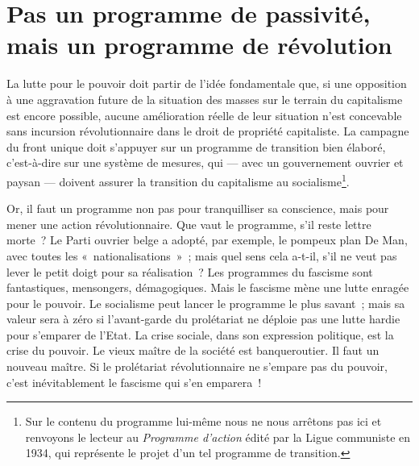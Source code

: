 \documentclass[french,twoside]{book} %
\begin{document}
\section[{Pas un programme de passivité, mais un programme de révolution}]{Pas un programme de passivité, mais un programme de révolution}
\noindent La lutte pour le pouvoir doit partir de l’idée fondamentale que, si une opposition à une aggravation future de la situation des masses sur le terrain du capitalisme est encore possible, aucune amélioration réelle de leur situation n’est concevable sans incursion révolutionnaire dans le droit de propriété capitaliste. La campagne du front unique doit s’appuyer sur un programme de transition bien élaboré, c’est-à-dire sur une système de mesures, qui — avec un gouvernement ouvrier et paysan — doivent assurer la transition du capitalisme au socialisme\footnote{ \noindent Sur le contenu du programme lui-même nous ne nous arrêtons pas ici et renvoyons le lecteur au \emph{Programme d’action} édité par la Ligue communiste en 1934, qui représente le projet d’un tel programme de transition.
 }.\par
Or, il faut un programme non pas pour tranquilliser sa conscience, mais pour mener une action révolutionnaire. Que vaut le programme, s’il reste lettre morte ? Le Parti ouvrier belge a adopté, par exemple, le pompeux plan De Man, avec toutes les « nationalisations » ; mais quel  sens cela a-t-il, s’il ne veut pas lever le petit doigt pour sa réalisation ? Les programmes du fascisme sont fantastiques, mensongers, démagogiques. Mais le fascisme mène une lutte enragée pour le pouvoir. Le socialisme peut lancer le programme le plus savant ; mais sa valeur sera à zéro si l’avant-garde du prolétariat ne déploie pas une lutte hardie pour s’emparer de l’Etat. La crise sociale, dans son expression politique, est la crise du pouvoir. Le vieux maître de la société est banqueroutier. Il faut un nouveau maître. Si le prolétariat révolutionnaire ne s’empare pas du pouvoir, c’est inévitablement le fascisme qui s’en emparera !\par
\end{document}
